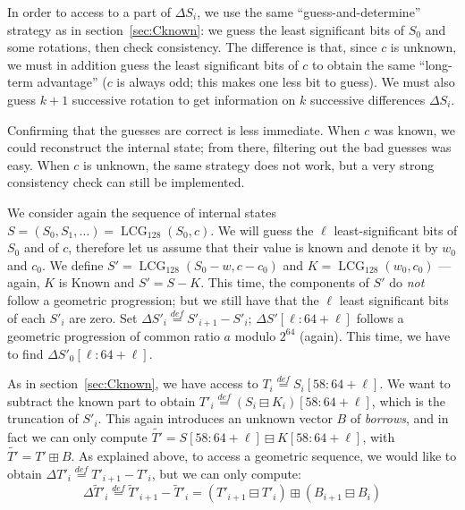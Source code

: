 \documentclass[submission,svgnames,journal=tosc]{iacrtrans}
\DeclareMathOperator{\LCG}{LCG}
\begin{document}
In order to access to a part of $\Delta S_i$, we use the same
``guess-and-determine'' strategy as in section~\ref{sec:Cknown}: we guess the
least significant bits of $S_0$ and some rotations, then check consistency. The
difference is that, since $c$ is unknown, we must in addition guess the least
significant bits of $c$ to obtain the same ``long-term advantage'' ($c$ is
always odd; this makes one less bit to guess). We must also guess $k+1$
successive rotation to get information on $k$ successive differences
$\Delta S_i$.

Confirming that the guesses are correct is less immediate. When $c$ was known,
we could reconstruct the internal state; from there, filtering out the bad
guesses was easy. When $c$ is unknown, the same strategy does not work, but a
very strong consistency check can still be implemented. %

We consider again the sequence of internal states
$S = (S_0, S_1, \dots) = \LCG_{128}(S_0, c)$. We will guess the $\ell$
least-significant bits of $S_0$ and of $c$, therefore let us assume that their
value is known and denote it by $w_0$ and $c_0$. We define
$S' = \LCG_{128}(S_0 - w, c - c_0)$ and $K = \LCG_{128}(w_0, c_0)$ --- again,
$K$ is Known and $S' = S - K$. This time, the components of $S'$ do \emph{not}
follow a geometric progression; but we still have that the $\ell$ least
significant bits of each $S'_i$ are zero. Set
$\Delta S'_i \stackrel{def}{=} S'_{i+1} - S'_i$; $\Delta S'[\ell:64+\ell]$
follows a geometric progression of common ratio $a$ modulo $2^{64}$
(again). This time, we have to find $\Delta S'_0[\ell:64+\ell]$.

As in section~\ref{sec:Cknown}, we have access to
$T_i \stackrel{def}{=} S_i[58:64+\ell]$. We want to subtract the known part to
obtain $T'_i \stackrel{def}{=} (S_i \boxminus K_i)[58:64+\ell]$, which is the
truncation of $S'_i$. This again introduces an unknown vector $B$ of
\emph{borrows}, and in fact we can only compute
$\widetilde{T'} = S[58:64+\ell] \boxminus K[58:64+\ell]$, with
$\widetilde{T'} = T' \boxplus B$. As explained above, to access a geometric
sequence, we would like to obtain
$\Delta T'_i \stackrel{def}{=} T'_{i+1} - T'_i$, but we can only compute:
\[
  \Delta \widetilde{T}'_i \stackrel{def}{=} \widetilde{T}'_{i+1} - \widetilde{T}'_i
  =  (T'_{i+1} \boxminus T'_{i}) \boxplus (B_{i+1} \boxminus B_{i})
\]
\end{document}
